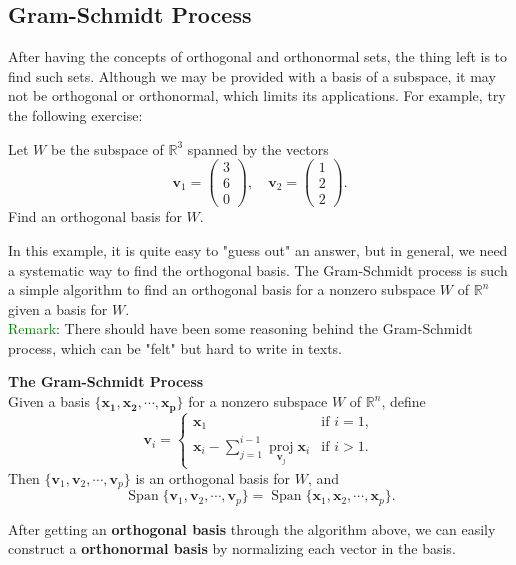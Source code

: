 \documentclass[10pt, a4paper]{article}
\newcommand{\R}{\mathbb{R}}
\newcommand{\vt}[1]{\mathbf{#1}}
\begin{document}
\subsection{Gram-Schmidt Process}
\indent After having the concepts of orthogonal and orthonormal sets, the thing left is to find such sets. Although we may be provided with a basis of a subspace, it may not be orthogonal or orthonormal, which limits its applications. For example, try the following exercise:
\begin{example}
    Let $W$ be the subspace of $\R^3$ spanned by the vectors\[
    \vt{v}_1 = \begin{pmatrix}
        3\\6\\0
    \end{pmatrix}, \quad \vt{v}_2 = \begin{pmatrix}
        1\\2\\2
    \end{pmatrix}.
    \]
    Find an orthogonal basis for $W$.
\end{example}
\indent In this example, it is quite easy to "guess out" an answer, but in general, we need a systematic way to find the orthogonal basis. The Gram-Schmidt process is such a simple algorithm to find an orthogonal basis for a nonzero subspace $W$ of $\R^n$ given a basis for $W$.\\
\indent \textcolor{Green}{Remark}: There should have been some reasoning behind the Gram-Schmidt process, which can be "felt" but hard to write in texts.
\begin{proposition}
    \textbf{The Gram-Schmidt Process}\\
    Given a basis $\{\vt{x_1}, \vt{x_2}, \cdots, \vt{x_p}\}$ for a nonzero subspace $W$ of $\R^n$, define\[\vt{v}_i = 
    \begin{cases}
        \vt{x}_1 & \text{if } i = 1,\\
        \vt{x}_i - \sum_{j=1}^{i-1}\operatorname*{proj}_{\vt{v}_j}\vt{x}_i & \text{if } i > 1.
    \end{cases}
    \]
    Then $\{\vt{v}_1, \vt{v}_2, \cdots, \vt{v}_p\}$ is an orthogonal basis for $W$, and \[
    \operatorname*{Span}\{ \vt{v}_1, \vt{v}_2, \cdots, \vt{v}_p\} = \operatorname*{Span}\{ \vt{x}_1, \vt{x}_2, \cdots, \vt{x}_p\}.
    \]
\end{proposition}
\indent After getting an \textbf{orthogonal basis} through the algorithm above, we can easily construct a \textbf{orthonormal basis} by normalizing each vector in the basis.
\end{document}
